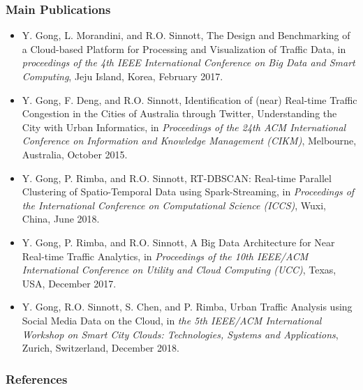 \begin{frame}
    \frametitle{Main Publications}
    \begin{itemize} \tiny
	    \item Y. Gong, L. Morandini, and R.O. Sinnott, The Design and Benchmarking of a Cloud-based Platform for Processing and Visualization of Traffic Data, in \emph{proceedings of the 4th IEEE International Conference on Big Data and Smart Computing}, Jeju Island, Korea, February 2017.
	    \item Y. Gong, F. Deng, and R.O. Sinnott, Identification of (near) Real-time Traffic Congestion in the Cities of Australia through Twitter, Understanding the City with Urban Informatics, in \emph{Proceedings of the 24th ACM International Conference on Information and Knowledge Management (CIKM)}, Melbourne, Australia, October 2015.
	    \item Y. Gong, P. Rimba, and R.O. Sinnott, RT-DBSCAN: Real-time Parallel Clustering of Spatio-Temporal Data using Spark-Streaming, in \emph{Proceedings of the International Conference on Computational Science (ICCS)}, Wuxi, China, June 2018.
	    \item Y. Gong, P. Rimba, and R.O. Sinnott, A Big Data Architecture for Near Real-time Traffic Analytics, in \emph{Proceedings of the 10th IEEE/ACM International Conference on Utility and Cloud Computing (UCC)}, Texas, USA, December 2017.
        \item Y. Gong, R.O. Sinnott, S. Chen, and P. Rimba, Urban Traffic Analysis using Social Media Data on the Cloud, in \emph{the 5th IEEE/ACM International Workshop on Smart City Clouds: Technologies, Systems and Applications}, Zurich, Switzerland, December 2018.
    \end{itemize}
\end{frame}

\begin{frame}[plain]
    \tiny
    \frametitle{References}
    
    
\end{frame}


